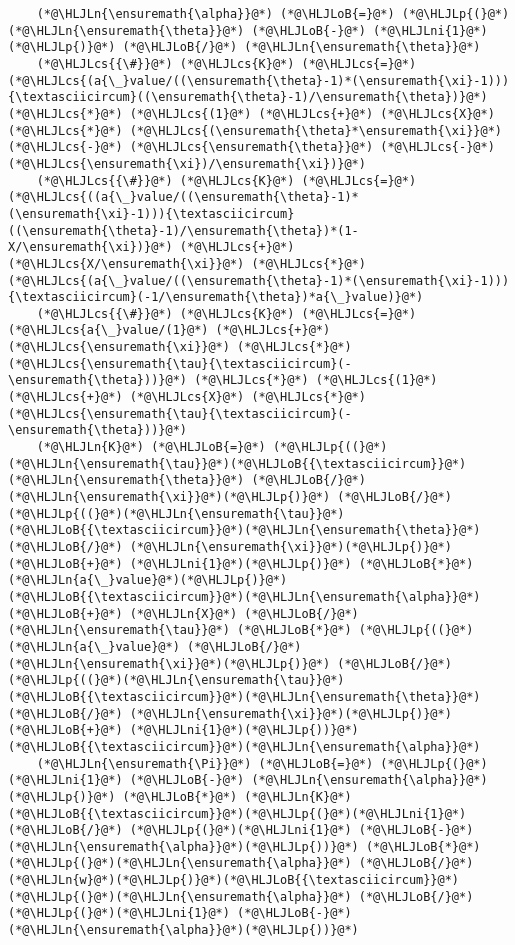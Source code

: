 \documentclass[12pt,a4paper]{article}
\newcommand{\HLJLn}[1]{#1}
\newcommand{\HLJLni}[1]{\textcolor[RGB]{59,151,46}{#1}}
\newcommand{\HLJLoB}[1]{\textcolor[RGB]{102,102,102}{\textbf{#1}}}
\newcommand{\HLJLp}[1]{#1}
\newcommand{\HLJLcs}[1]{\textcolor[RGB]{153,153,119}{\textit{#1}}}
\begin{document}
\begin{lstlisting}
    (*@\HLJLn{\ensuremath{\alpha}}@*) (*@\HLJLoB{=}@*) (*@\HLJLp{(}@*)(*@\HLJLn{\ensuremath{\theta}}@*) (*@\HLJLoB{-}@*) (*@\HLJLni{1}@*)(*@\HLJLp{)}@*) (*@\HLJLoB{/}@*) (*@\HLJLn{\ensuremath{\theta}}@*)
    (*@\HLJLcs{{\#}}@*) (*@\HLJLcs{K}@*) (*@\HLJLcs{=}@*) (*@\HLJLcs{(a{\_}value/((\ensuremath{\theta}-1)*(\ensuremath{\xi}-1))){\textasciicircum}((\ensuremath{\theta}-1)/\ensuremath{\theta})}@*) (*@\HLJLcs{*}@*) (*@\HLJLcs{(1}@*) (*@\HLJLcs{+}@*) (*@\HLJLcs{X}@*) (*@\HLJLcs{*}@*) (*@\HLJLcs{(\ensuremath{\theta}*\ensuremath{\xi}}@*) (*@\HLJLcs{-}@*) (*@\HLJLcs{\ensuremath{\theta}}@*) (*@\HLJLcs{-}@*) (*@\HLJLcs{\ensuremath{\xi})/\ensuremath{\xi})}@*)
    (*@\HLJLcs{{\#}}@*) (*@\HLJLcs{K}@*) (*@\HLJLcs{=}@*) (*@\HLJLcs{((a{\_}value/((\ensuremath{\theta}-1)*(\ensuremath{\xi}-1))){\textasciicircum}((\ensuremath{\theta}-1)/\ensuremath{\theta})*(1-X/\ensuremath{\xi})}@*) (*@\HLJLcs{+}@*) (*@\HLJLcs{X/\ensuremath{\xi}}@*) (*@\HLJLcs{*}@*) (*@\HLJLcs{(a{\_}value/((\ensuremath{\theta}-1)*(\ensuremath{\xi}-1))){\textasciicircum}(-1/\ensuremath{\theta})*a{\_}value)}@*)
    (*@\HLJLcs{{\#}}@*) (*@\HLJLcs{K}@*) (*@\HLJLcs{=}@*) (*@\HLJLcs{a{\_}value/(1}@*) (*@\HLJLcs{+}@*) (*@\HLJLcs{\ensuremath{\xi}}@*) (*@\HLJLcs{*}@*) (*@\HLJLcs{\ensuremath{\tau}{\textasciicircum}(-\ensuremath{\theta}))}@*) (*@\HLJLcs{*}@*) (*@\HLJLcs{(1}@*) (*@\HLJLcs{+}@*) (*@\HLJLcs{X}@*) (*@\HLJLcs{*}@*) (*@\HLJLcs{\ensuremath{\tau}{\textasciicircum}(-\ensuremath{\theta}))}@*)
    (*@\HLJLn{K}@*) (*@\HLJLoB{=}@*) (*@\HLJLp{((}@*)(*@\HLJLn{\ensuremath{\tau}}@*)(*@\HLJLoB{{\textasciicircum}}@*)(*@\HLJLn{\ensuremath{\theta}}@*) (*@\HLJLoB{/}@*) (*@\HLJLn{\ensuremath{\xi}}@*)(*@\HLJLp{)}@*) (*@\HLJLoB{/}@*) (*@\HLJLp{((}@*)(*@\HLJLn{\ensuremath{\tau}}@*)(*@\HLJLoB{{\textasciicircum}}@*)(*@\HLJLn{\ensuremath{\theta}}@*) (*@\HLJLoB{/}@*) (*@\HLJLn{\ensuremath{\xi}}@*)(*@\HLJLp{)}@*) (*@\HLJLoB{+}@*) (*@\HLJLni{1}@*)(*@\HLJLp{)}@*) (*@\HLJLoB{*}@*) (*@\HLJLn{a{\_}value}@*)(*@\HLJLp{)}@*)(*@\HLJLoB{{\textasciicircum}}@*)(*@\HLJLn{\ensuremath{\alpha}}@*) (*@\HLJLoB{+}@*) (*@\HLJLn{X}@*) (*@\HLJLoB{/}@*) (*@\HLJLn{\ensuremath{\tau}}@*) (*@\HLJLoB{*}@*) (*@\HLJLp{((}@*)(*@\HLJLn{a{\_}value}@*) (*@\HLJLoB{/}@*) (*@\HLJLn{\ensuremath{\xi}}@*)(*@\HLJLp{)}@*) (*@\HLJLoB{/}@*) (*@\HLJLp{((}@*)(*@\HLJLn{\ensuremath{\tau}}@*)(*@\HLJLoB{{\textasciicircum}}@*)(*@\HLJLn{\ensuremath{\theta}}@*) (*@\HLJLoB{/}@*) (*@\HLJLn{\ensuremath{\xi}}@*)(*@\HLJLp{)}@*) (*@\HLJLoB{+}@*) (*@\HLJLni{1}@*)(*@\HLJLp{))}@*)(*@\HLJLoB{{\textasciicircum}}@*)(*@\HLJLn{\ensuremath{\alpha}}@*)
    (*@\HLJLn{\ensuremath{\Pi}}@*) (*@\HLJLoB{=}@*) (*@\HLJLp{(}@*)(*@\HLJLni{1}@*) (*@\HLJLoB{-}@*) (*@\HLJLn{\ensuremath{\alpha}}@*)(*@\HLJLp{)}@*) (*@\HLJLoB{*}@*) (*@\HLJLn{K}@*)(*@\HLJLoB{{\textasciicircum}}@*)(*@\HLJLp{(}@*)(*@\HLJLni{1}@*) (*@\HLJLoB{/}@*) (*@\HLJLp{(}@*)(*@\HLJLni{1}@*) (*@\HLJLoB{-}@*) (*@\HLJLn{\ensuremath{\alpha}}@*)(*@\HLJLp{))}@*) (*@\HLJLoB{*}@*) (*@\HLJLp{(}@*)(*@\HLJLn{\ensuremath{\alpha}}@*) (*@\HLJLoB{/}@*) (*@\HLJLn{w}@*)(*@\HLJLp{)}@*)(*@\HLJLoB{{\textasciicircum}}@*)(*@\HLJLp{(}@*)(*@\HLJLn{\ensuremath{\alpha}}@*) (*@\HLJLoB{/}@*) (*@\HLJLp{(}@*)(*@\HLJLni{1}@*) (*@\HLJLoB{-}@*) (*@\HLJLn{\ensuremath{\alpha}}@*)(*@\HLJLp{))}@*)


\end{lstlisting}
\end{document}

